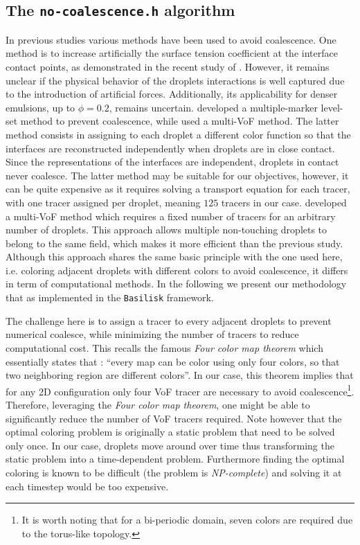 \subsection{The \texttt{no-coalescence.h} algorithm}

In previous studies various methods have been used to avoid coalescence. 
One method is to increase artificially the surface tension coefficient at the interface contact points, as demonstrated in the recent study of \citet{hidman2023assessing}.
However, it remains unclear if the physical behavior of the droplets interactions is well captured due to the introduction of artificial forces. 
Additionally, its applicability for denser emulsions, up to $\phi = 0.2$, remains uncertain. 
\citet{balcazar2015multiple} developed a multiple-marker level-set method to prevent coalescence, while \citet{zhang2021direct} used a multi-VoF method. 
The latter method consists in assigning to each droplet a different color function so  that the interfaces are reconstructed independently when droplets are in close contact.
Since the representations of the interfaces are independent, droplets in contact never coalesce.  
The latter method may be suitable for our objectives, however, it can be quite expensive as it requires solving a transport equation for each tracer, with one tracer assigned per droplet, meaning $125$ tracers in our case. 
\citet{karnakov2022computing} developed a multi-VoF method which requires a fixed number of tracers for an arbitrary number of droplets.
This approach allows multiple non-touching droplets to belong to the same field, which makes it more efficient than the previous study.
Although this approach shares the same basic principle with the one used here, i.e. coloring adjacent droplets with different colors to avoid coalescence, it differs in term of computational methods. 
In the following we present our methodology that as implemented in the \texttt{Basilisk} framework. 

The challenge here is to assign a tracer to every adjacent droplets to prevent numerical coalesce, while minimizing the number of tracers to reduce computational cost. 
This recalls the famous \textit{Four color map theorem} \citep{appel1977solution} which essentially states that : 
\enquote{every map can be color using only four colors, so that two neighboring region are different colors}. 
In our case, this theorem implies that for any 2D configuration only four VoF tracer are necessary to avoid coalescence\footnote{It is worth noting that for a bi-periodic domain, seven colors are required due to the torus-like topology.  }. 
Therefore, leveraging the \textit{Four color map theorem}, one might be able to significantly reduce the number of VoF tracers required.
Note however that the optimal coloring problem is originally a static problem that need to be solved only once. 
In our case, droplets move around over time thus transforming the static problem into a time-dependent problem. 
Furthermore finding the optimal coloring is known to be difficult (the problem is {\em NP-complete}) and solving it at each timestep would be too expensive.

